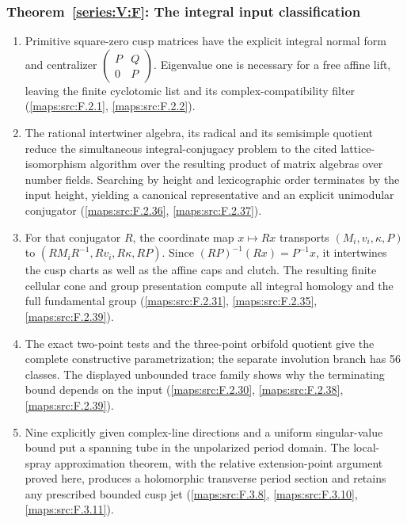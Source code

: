 \documentclass[11pt,a4paper]{article}
\numberwithin{equation}{section}
\theoremstyle{definition}
\begin{document}
\hypertarget{outline-V-F}{}
\subsubsection*{Theorem~\ref{series:V:F}: The integral input classification}
\begin{enumerate}[label=\arabic*.,leftmargin=*]
\item\hypertarget{step-V-F-1}{} Primitive square-zero cusp matrices have the explicit integral
  normal form and centralizer
  $\left(\begin{smallmatrix}P&Q\\0&P\end{smallmatrix}\right)$.
  Eigenvalue one is necessary for a free affine lift, leaving the
  finite cyclotomic list and its complex-compatibility filter
  (\cref{maps:src:F.2.1}, \cref{maps:src:F.2.2}).

\item\hypertarget{step-V-F-2}{} The rational intertwiner algebra, its radical and its
  semisimple quotient reduce the simultaneous integral-conjugacy
  problem to the cited lattice-isomorphism algorithm over the resulting
  product of matrix algebras over number fields.  Searching by height and lexicographic order terminates
  by the input height, yielding a canonical representative and an
  explicit unimodular conjugator (\cref{maps:src:F.2.36}, \cref{maps:src:F.2.37}).

\item\hypertarget{step-V-F-3}{} For that conjugator $R$, the coordinate map $x\mapsto Rx$
  transports $(M_i,v_i,\kappa,P)$ to
  $(RM_iR^{-1},Rv_i,R\kappa,RP)$.  Since
  $(RP)^{-1}(Rx)=P^{-1}x$, it intertwines the cusp charts
  as well as the affine caps and clutch.  The resulting finite
  cellular cone and group presentation compute all integral homology
  and the full fundamental group (\cref{maps:src:F.2.31}, \cref{maps:src:F.2.35}, \cref{maps:src:F.2.39}).

\item\hypertarget{step-V-F-4}{} The exact two-point tests and the three-point
  orbifold quotient give the complete constructive parametrization;
  the separate involution branch has 56 classes.  The displayed
  unbounded trace family shows why the terminating bound depends on
  the input (\cref{maps:src:F.2.30}, \cref{maps:src:F.2.38}, \cref{maps:src:F.2.39}).

\item\hypertarget{step-V-F-5}{} Nine explicitly given complex-line directions and a uniform
  singular-value bound put a spanning tube in the unpolarized period
  domain.  The local-spray approximation theorem, with the
  relative extension-point argument proved here, produces a
  holomorphic transverse period section and retains any prescribed
  bounded cusp jet (\cref{maps:src:F.3.8}, \cref{maps:src:F.3.10}, \cref{maps:src:F.3.11}).


\end{enumerate}
\end{document}
